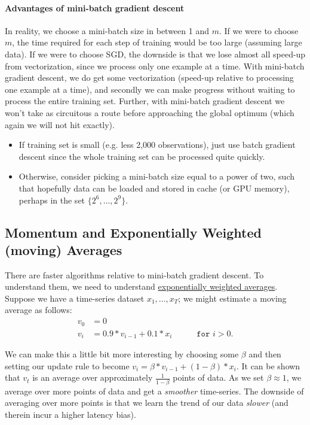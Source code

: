 \documentclass[12pt]{article}
\begin{document}
\paragraph{Advantages of mini-batch gradient descent}
In reality, we choose a mini-batch size in between 1 and $m$. If we were to choose $m$, the time required for each step of 
training would be too large (assuming large data). If we were to choose SGD, the downside is that we lose almost all speed-up from 
vectorization, since we process only one example at a time. With mini-batch gradient descent, we do get some 
vectorization (speed-up relative to processing one example at a time), and secondly we can make progress without 
waiting to process the entire training set. Further, with mini-batch gradient descent we won't take as circuitous a 
route before approaching the global optimum (which again we will not hit exactly).

\begin{itemize}   
  \item If training set is small (e.g. less 2,000 observations), just use batch gradient descent since the whole training set can be processed quite quickly.
  \item Otherwise, consider picking a mini-batch size equal to a power of two, such that hopefully data can 
    be loaded and stored in cache (or GPU memory), perhaps in the set $\{2^6, \ldots, 2^9\}$. 
\end{itemize}

\subsection{Momentum and Exponentially Weighted (moving) Averages} There are faster algorithms relative to mini-batch gradient descent.
To understand them, we need to understand \href{https://en.wikipedia.org/wiki/Moving_average#Exponential_moving_average}{exponentially weighted averages}. Suppose we have a time-series dataset  $x_1, \ldots, x_T$; we might estimate a moving average as follows:
\begin{align}
  \label{eq: expmovavg}   v_0 &= 0 \nonumber \\
  v_i &= 0.9 * v_{i-1} + 0.1 * x_i \hspace{35pt} \texttt{for } i > 0. \end{align}

We can make this a little bit more interesting by choosing some $\beta$ and then setting our update rule to become $v_i = \beta * v_{i-1} + (1-\beta) * x_i$. It can be shown that $v_t$ is an average over approximately $\frac{1}{1-\beta}$ points of data. As we set $\beta \approx 1$, we average over more points of data and get a \emph{smoother} time-series. The downside of averaging over more points is that we learn the trend of our data \emph{slower} (and therein incur a higher latency bias).
\end{document}
